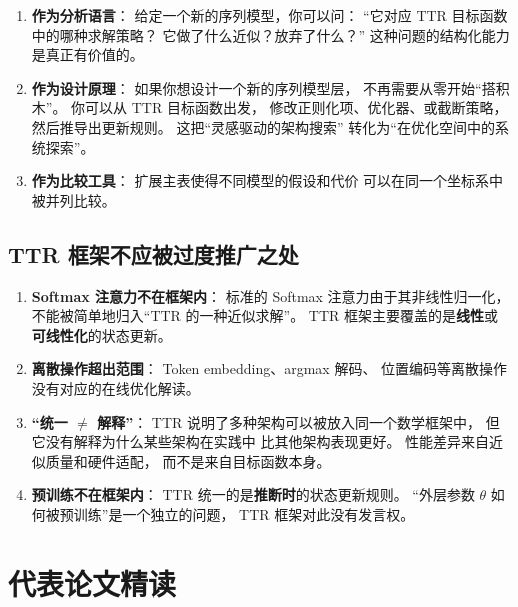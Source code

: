 \begin{enumerate}
  \item \textbf{作为分析语言}：
    给定一个新的序列模型，你可以问：
    ``它对应 TTR 目标函数中的哪种求解策略？
    它做了什么近似？放弃了什么？''
    这种问题的结构化能力是真正有价值的。

  \item \textbf{作为设计原理}：
    如果你想设计一个新的序列模型层，
    不再需要从零开始``搭积木''。
    你可以从 TTR 目标函数出发，
    修改正则化项、优化器、或截断策略，
    然后推导出更新规则。
    这把``灵感驱动的架构搜索''
    转化为``在优化空间中的系统探索''。

  \item \textbf{作为比较工具}：
    扩展主表使得不同模型的假设和代价
    可以在同一个坐标系中被并列比较。
\end{enumerate}

\subsection*{TTR 框架不应被过度推广之处}

\begin{enumerate}
  \item \textbf{Softmax 注意力不在框架内}：
    标准的 Softmax 注意力由于其非线性归一化，
    不能被简单地归入``TTR 的一种近似求解''。
    TTR 框架主要覆盖的是\textbf{线性}或\textbf{可线性化}的状态更新。

  \item \textbf{离散操作超出范围}：
    Token embedding、argmax 解码、
    位置编码等离散操作
    没有对应的在线优化解读。

  \item \textbf{``统一 $\neq$ 解释''}：
    TTR 说明了多种架构可以被放入同一个数学框架中，
    但它没有解释为什么某些架构在实践中
    比其他架构表现更好。
    性能差异来自近似质量和硬件适配，
    而不是来自目标函数本身。

  \item \textbf{预训练不在框架内}：
    TTR 统一的是\textbf{推断时}的状态更新规则。
    ``外层参数 $\theta$ 如何被预训练''是一个独立的问题，
    TTR 框架对此没有发言权。
\end{enumerate}

\section{代表论文精读}
\label{sec:ttr_papers}

